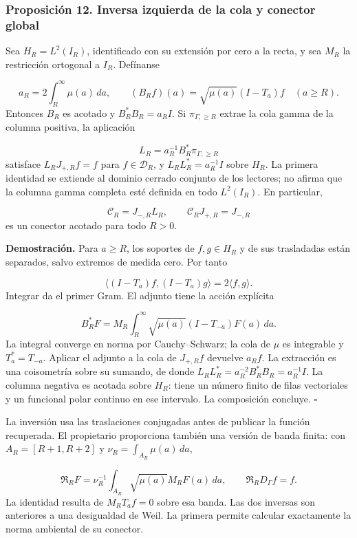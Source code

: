 \subsubsection*{Proposición 12. Inversa izquierda de la cola y conector global}
Sea \(H_R=L^2(I_R)\), identificado con su extensión por cero a la recta, y sea \(M_R\) la restricción ortogonal a \(I_R\). Defínanse

\[
a_R=2\int_R^\infty\mu(a)\,da,\qquad
(B_Rf)(a)=\sqrt{\mu(a)}(I-T_a)f\quad(a\geq R).
\]
Entonces \(B_R\) es acotado y \(B_R^*B_R=a_RI\). Si \(\pi_{\Gamma,\geq R}\) extrae la cola gamma de la columna positiva, la aplicación

\[
L_R=a_R^{-1}B_R^*\pi_{\Gamma,\geq R}
\]
satisface \(L_RJ_{+,R}f=f\) para \(f\in\mathcal D_R\), y \(L_RL_R^*=a_R^{-1}I\) sobre \(H_R\). La primera identidad se extiende al dominio cerrado conjunto de los lectores; no afirma que la columna gamma completa esté definida en todo \(L^2(I_R)\). En particular,

\[
\mathcal C_R=J_{-,R}L_R,\qquad
\mathcal C_RJ_{+,R}=J_{-,R}
\]
es un conector acotado para todo \(R>0\).

\textbf{Demostración.} Para \(a\geq R\), los soportes de \(f,g\in H_R\) y de sus trasladadas están separados, salvo extremos de medida cero. Por tanto

\[
\langle(I-T_a)f,(I-T_a)g\rangle=2\langle f,g\rangle.
\]
Integrar da el primer Gram. El adjunto tiene la acción explícita

\[
B_R^*F=M_R\int_R^\infty\sqrt{\mu(a)}(I-T_{-a})F(a)\,da.
\]
La integral converge en norma por Cauchy–Schwarz; la cola de \(\mu\) es integrable y \(T_a^*=T_{-a}\). Aplicar el adjunto a la cola de \(J_{+,R}f\) devuelve \(a_Rf\). La extracción es una coisometría sobre su sumando, de donde \(L_RL_R^*=a_R^{-2}B_R^*B_R=a_R^{-1}I\). La columna negativa es acotada sobre \(H_R\): tiene un número finito de filas vectoriales y un funcional polar continuo en ese intervalo. La composición concluye. \hfill\(\square\)

La inversión usa las traslaciones conjugadas antes de publicar la función recuperada. El propietario proporciona también una versión de banda finita: con \(A_R=[R+1,R+2]\) y \(\nu_R=\int_{A_R}\mu(a)\,da\),

\[
\mathfrak R_RF=\nu_R^{-1}\int_{A_R}
\sqrt{\mu(a)}M_RF(a)\,da,\qquad
\mathfrak R_RD_\Gamma f=f.
\]
La identidad resulta de \(M_RT_af=0\) sobre esa banda. Las dos inversas son anteriores a una desigualdad de Weil. La primera permite calcular exactamente la norma ambiental de su conector.

